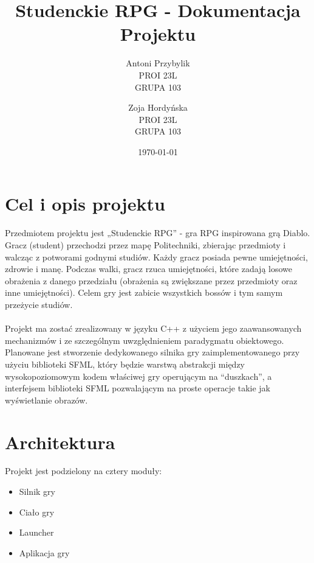 \documentclass[12pt, titlepage]{article}
\author{Antoni Przybylik \\ PROI 23L \\ GRUPA 103 \and
	Zoja Hordyńska \\ PROI 23L \\ GRUPA 103}
\date{\today}
\title{Studenckie RPG - Dokumentacja Projektu}
\begin{document}
\maketitle
\justifying



\lstset{style=listingstyle}

\section{Cel i opis projektu}
Przedmiotem projektu jest „Studenckie RPG” - gra RPG inspirowana grą Diablo. Gracz (student) przechodzi przez mapę Politechniki, zbierając przedmioty i walcząc z potworami godnymi studiów. Każdy gracz posiada pewne umiejętności, zdrowie i manę. Podczas walki,  gracz rzuca umiejętności, które zadają losowe obrażenia z danego przedziału (obrażenia są zwiększane przez przedmioty oraz inne umiejętności). Celem gry jest zabicie wszystkich bossów i tym samym przeżycie studiów.
\\~\\
Projekt ma zostać zrealizowany w języku C++ z użyciem
jego zaawansowanych mechanizmów i ze szczególnym uwzględnieniem
paradygmatu obiektowego. Planowane jest stworzenie
dedykowanego silnika gry zaimplementowanego przy użyciu
biblioteki SFML, który będzie warstwą abstrakcji między
wysokopoziomowym kodem właściwej gry operującym na "`duszkach"',
a interfejsem biblioteki SFML pozwalającym na proste operacje
takie jak wyświetlanie obrazów.

\section{Architektura}
Projekt jest podzielony na cztery moduły:
\begin{itemize}
	\item Silnik gry
	\item Ciało gry
	\item Launcher
	\item Aplikacja gry
\end{itemize}
\end{document}
